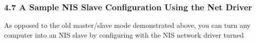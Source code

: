 \label{A-Sample-NIS-Slave-Configuration-Using-the-Net-Driver}

\subsubsection*{4.7 A Sample NIS Slave Configuration Using the Net Driver}

\label{index-Example_002c-NIS-slave-81}
\label{index-NIS-slave-conf-82}
\label{index-Configuration_002c-NIS-slave-conf-83}
As opposed to the old master/slave mode demonstrated above, you can turn any
computer into an NIS slave by configuring with the NIS network driver turned
